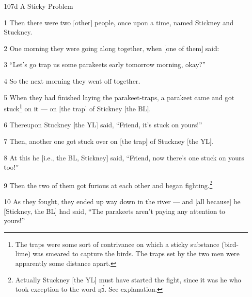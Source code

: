 
107d A Sticky Problem

1 Then there were two [other] people, once upon a time, named Stickney and Stuckney.

2 One morning they were going along together, when [one of them] said:

3 ``Let's go trap us some parakeets early tomorrow morning, okay?''

4 So the next morning they went off together.

5 When they had finished laying the parakeet-traps, a parakeet came and got stuck\footnote{The traps were some sort of contrivance on which a sticky substance (bird-lime) was smeared to capture the birds. The traps set by the two men were apparently some distance apart.}
on it --- on [the trap] of Stickney [the BL].

6 Thereupon Stuckney [the YL] said, ``Friend, it's stuck on yours!''

7 Then, another one got stuck over on [the trap] of Stuckney [the YL].

8 At this he [i.e., the BL, Stickney] said, ``Friend, now there's one stuck on
yours too!''

9 Then the two of them got furious at each other and began fighting.\footnote{Actually Stuckney [the YL] must have started the fight, since it was he who took exception to the word ŋɔ́. See explanation.}

10 As they fought, they ended up way down in the river --- and [all because] he
[Stickney, the BL] had said, ``The parakeets aren't paying any attention to yours!''

